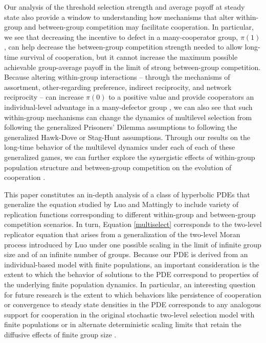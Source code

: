 \documentclass[11pt]{article}
\numberwithin{equation}{section}
\newcommand{\myindent}{\hspace{10mm}}
\begin{document}
{\myindent Our analysis of the threshold selection strength and average payoff at steady state also provide a window to understanding how mechanisms that alter within-group and between-group competition may facilitate cooperation. In particular, we see that decreasing the incentive to defect in a many-cooperator group, $\pi(1)$, can help decrease the between-group competition strength needed to allow long-time survival of cooperation, but it cannot increase the maximum possible achievable group-average payoff in the limit of strong between-group competition. Because altering within-group interactions -- through the mechanisms of assortment, other-regarding preference, indirect reciprocity, and network reciprocity -- can increase $\pi(0)$ to a positive value and provide cooperators an individual-level advantage in a many-defector group \cite{grafen1979hawk,smith1982evolution,taylor2007transforming,cooney2019assortment}, we can also see that such within-group mechanisms can change the dynamics of multilevel selection from following the generalized Prisoners' Dilemma assumptions to following the generalized Hawk-Dove or Stag-Hunt assumptions. Through our results on the long-time behavior of the multilevel dynamics under each of each of these generalized games, we can further explore the synergistic effects of within-group population structure and between-group competition on the evolution of cooperation \cite{cooney2019assortment}.  


\myindent This paper constitutes an in-depth analysis of a class of hyperbolic PDEs that generalize the equation studied by Luo and Mattingly \cite{luo2014unifying} to include variety of replication functions corresponding to different within-group and between-group competition scenarios. In turn, Equation \eqref{multiselect} corresponds to the two-level replicator equation that arises from a generalization of the two-level Moran process introduced by Luo \cite{luo2014unifying} under one possible scaling in the limit of infinite group size and of an infinite number of groups. Because our PDE is derived from an individual-based model with finite populations, an important consideration is the extent to which the behavior of solutions to the PDE correspond to properties of the underlying finite population dynamics. In particular, an interesting question for future research is the extent to which behaviors like persistence of cooperation or convergence to steady state densities in the PDE corresponds to any analogous support for cooperation in the original stochastic two-level selection model with finite populations or in alternate deterministic scaling limits that retain the diffusive effects of finite group size \cite{luo2014unifying,luo2017scaling,cooney2019replicator}. 

}
\end{document}
